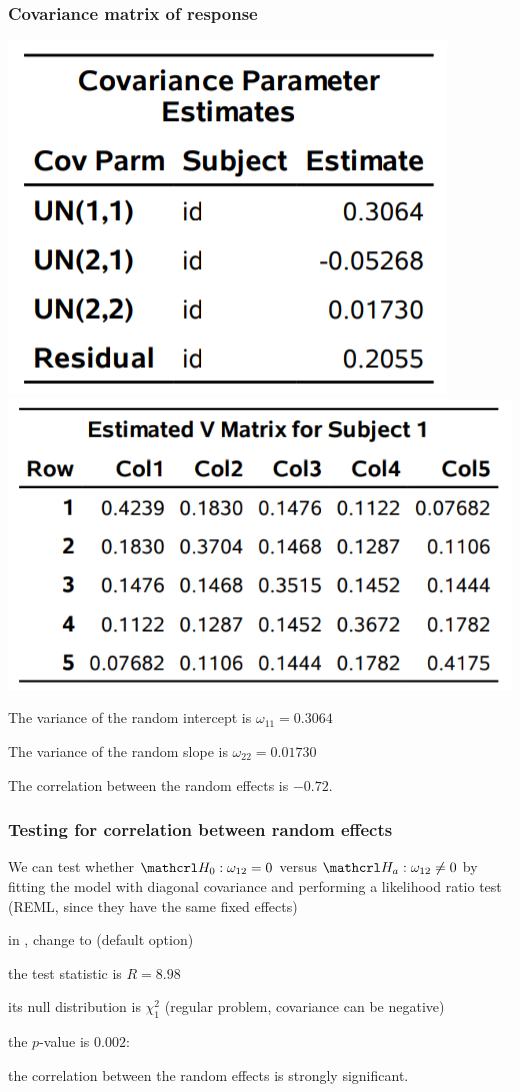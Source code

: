 \documentclass{beamer}
\begin{document}
\begin{frame}
 \frametitle{Covariance matrix of response}
 \begin{center}
\includegraphics[width = 0.4\linewidth]{img/c6/slides7-e25}
\includegraphics[width = 0.55\linewidth]{img/c6/slides7-e24}
\end{center}
\bi \item 
The variance of the random intercept is $\omega_{11}=0.3064$
\item The variance of the random slope is $\omega_{22}=0.01730$
\item The correlation between the random effects is $-0.72$.
\ei
\end{frame}
\begin{frame}
\frametitle{Testing for correlation between random effects}
\bi
\item We can test whether $\Hy_0: \omega_{12}=0$ versus $\Hy_a: \omega_{12} \neq 0$ by fitting the model with diagonal covariance and performing a likelihood ratio test (REML, since they have the same fixed effects) 
\bi
\item in \SASlang{}, change  to  (default option)
\item the test statistic is $R=8.98$ 
\item its null distribution is $\chi^2_1$ (regular problem, covariance can be negative)
\item the $p$-value is $0.002$:
\item the correlation between the random effects is strongly significant. \ei
\ei
\end{frame}
\end{document}
